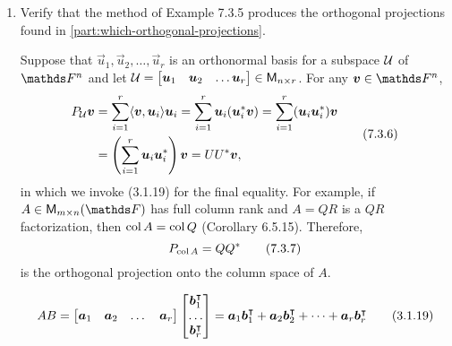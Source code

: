 \documentclass{../homework}
\begin{document}
\begin{description}
\begin{enumerate}
\begin{solution}
    \end{solution}

  \item Verify that the method of Example 7.3.5 produces the
    orthogonal projections found in
    \ref{part:which-orthogonal-projections}.

    \begin{bookexample}[7.3.5]
      Suppose that \(\vec u_1, \vec u_2, \dots, \vec u_r\) is an
      orthonormal basis for a subspace \(\mathcal{U}\) of \(\FF^n\) and
      let \(\Uspace =
      \begin{bmatrix}
        \vec u_1 & \vec u_2 & \dots \vec u_r
      \end{bmatrix}
      \in \M_{n \times r}\).  For any \(\vec v \in \FF^n\),
      \begin{align*}
        \begin{split}
          P_\Uspace \vec v
          &= \sum_{i=1}^r \inner{\vec v, \vec u_i} \vec u_i
          = \sum_{i=1}^r \vec u_i (\vec u_i^* \vec v)
          = \sum_{i=1}^r (\vec u_i \vec u_i^*) \vec v \\
          &= \Paren{\sum_{i=1}^r \vec u_i \vec u_i^*} \vec v
          = U U^* \vec v,
        \end{split}
        \tag{7.3.6}
      \end{align*}
      in which we invoke (3.1.19) for the final equality.  For
      example, if \(A \in \M_{m \times n} (\FF)\) has full column rank
      and \(A = QR\) is a \(QR\) factorization, then
      \(\operatorname{col} A = \operatorname{col} Q\) (Corollary 6.5.15).  Therefore,
      \[
        P_{\operatorname{col} A} = Q Q^*
        \tag{7.3.7}
      \]
      is the orthogonal projection onto the column space of \(A\).
    \end{bookexample}

    \begin{book}
      \[
        AB =
        \begin{bmatrix}
          \vec a_1 & \vec a_2 & \dots & \vec a_r
        \end{bmatrix}
        \begin{bmatrix}
          \vec b_1^\transpose \\ \dots \\ \vec b_r^\transpose
        \end{bmatrix}
        = \vec a_1 \vec b_1^\transpose
        + \vec a_2 \vec b_2^\transpose
        + \dots
        + \vec a_r \vec b_r^\transpose
        \tag{3.1.19}
      \]
    \end{book}


\end{enumerate}
\end{description}
\end{document}
